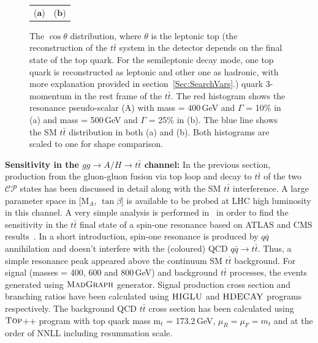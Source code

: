 \begin{figure}[htp]
\begin{tabular}{cc}
  \qquad ($\mathbf{a}$)\qquad&($\mathbf{b}$) \\
\end{tabular}
\caption{The $\cos\theta$ distribution, where $\theta$ is the leptonic top (the reconstruction of the $t\bar t$ system in the detector depends on the final state of the top quark. For the semileptonic decay mode, one top quark is reconstructed as leptonic and other one as hadronic, with more explanation provided in section~\ref{Sec:SearchVars}.) quark 3-momentum in the rest frame of the $t\bar t$. The red histogram shows the resonance pseudo-scalar (A) with mass = 400\,GeV and $\Gamma$ = 10\% in (a) and mass = 500\,GeV and $\Gamma$ = 25\% in (b). The blue line shows the SM $t\bar t$ distribution in both (a) and (b). Both histograms are scaled to one for shape comparison.}\label{fig:collins_soper}
\end{figure}

\noindent \textbf{Sensitivity in the $gg\rightarrow A/H \rightarrow t\bar t$ channel:} In the previous section, production from the gluon-gluon fusion via top loop and decay to $t\bar t$ of the two $\mathcal{CP}$ states has been discussed in detail along with the SM $t\bar t$ interference. A large parameter space in [M$_{A}$, $\tan\beta$] is available to be probed at LHC high luminosity in this channel. A very simple analysis is performed in~\cite{Djouadi:2015jea} in order to find the sensitivity in the $t\bar t$ final state of a spin-one resonance based on ATLAS and CMS results~\cite{PhysRevD.88.012004,PhysRevLett.111.211804}. In a short introduction, spin-one resonance is produced by $q\bar q$ annihilation and doesn't interfere with the (coloured) QCD $q\bar q\rightarrow t\bar t$. Thus, a simple resonance peak appeared above the continuum SM $t\bar t$ background. For signal (masses = 400, 600 and 800\,GeV) and background $t\bar t$ processes, the events generated using $\textsc{MadGraph}$ generator. Signal production cross section and branching ratios have been calculated using $\textsc{HIGLU}$ and $\textsc{HDECAY}$ programs respectively. The background QCD $t\bar t$ cross section has been calculated using $\textsc{Top}$++ program with top quark mass m$_{t}$ = 173.2\,GeV, $\mu_{R}=\mu_{F}=m_{t}$ and at the order of NNLL including resummation scale. 

